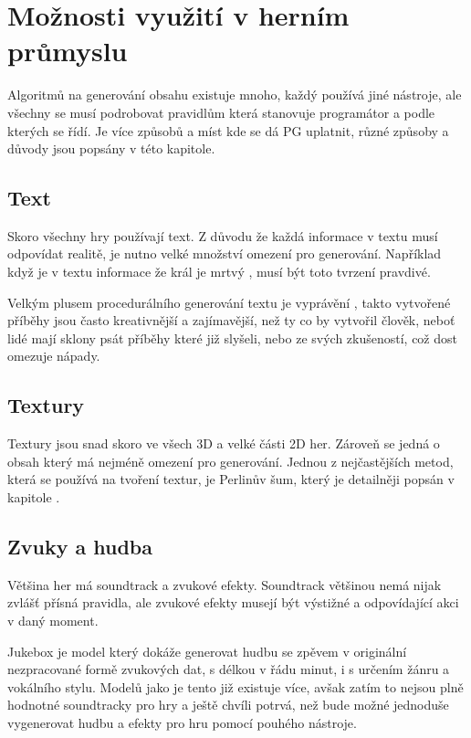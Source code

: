 
\section{Možnosti využití v herním průmyslu}
\label{metody}
Algoritmů na generování obsahu existuje mnoho, každý používá jiné nástroje, ale všechny se musí podrobovat pravidlům která stanovuje programátor a podle kterých se řídí. Je více způsobů a míst kde se dá PG uplatnit, různé způsoby a důvody jsou popsány v této kapitole.

\subsection{Text}
Skoro všechny hry používají text. Z důvodu že každá informace v textu musí odpovídat realitě, je nutno velké množství omezení pro generování. Například když je v textu informace že král je mrtvý \cite{liuDeep}, musí být toto tvrzení pravdivé.

Velkým plusem procedurálního generování textu je vyprávění \cite{madoc59000}, takto vytvořené příběhy jsou často kreativnější a zajímavější, než ty co by vytvořil člověk, neboť lidé mají sklony psát příběhy které již slyšeli, nebo ze svých zkušeností, což dost omezuje nápady.

\subsection{Textury}
Textury jsou snad skoro ve všech 3D a velké části 2D her. Zároveň se jedná o obsah který má nejméně omezení pro generování. Jednou z nejčastějších metod, která se používá na tvoření textur, je Perlinův šum, který je detailněji popsán v kapitole .

\subsection{Zvuky a hudba}
Většina her má soundtrack a zvukové efekty. Soundtrack většinou nemá nijak zvlášť přísná pravidla, ale zvukové efekty musejí být výstižné a odpovídající akci v daný moment. 

Jukebox \cite{Dhariwal2020JukeboxAG} je model který dokáže generovat hudbu se zpěvem v originální nezpracované formě zvukových dat, s délkou v řádu minut, i s určením žánru a vokálního stylu. Modelů jako je tento již existuje více, avšak zatím to nejsou plně hodnotné soundtracky pro hry a ještě chvíli potrvá, než bude možné jednoduše vygenerovat hudbu a efekty pro hru pomocí pouhého nástroje.

